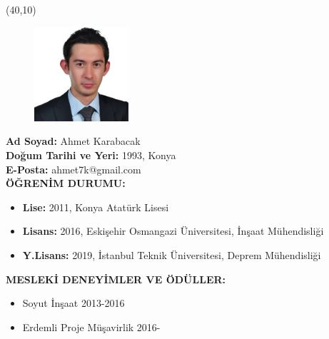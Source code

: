 \vspace{10mm}

\noindent \newsavebox{\mysquare}
\savebox{\mysquare}{\textcolor{black}{\rule[2.3pt]{3.4pt}{3.4pt}}}

\setlength{\TPHorizModule}{10pt}
\setlength{\TPVertModule}{10pt}

\begin{textblock}{1}(40,10)
 	\begin{figure}[p]
		\includegraphics[width=3.5cm,keepaspectratio=true]{./fig/CV.jpg}
	\end{figure}
\end{textblock}

\noindent \textbf{Ad Soyad:} Ahmet Karabacak \\

\vspace{-3mm}
 \textbf{Doğum Tarihi ve Yeri:} 1993, Konya \\

\vspace{-3mm}
 \textbf{E-Posta:} ahmet7k@gmail.com \\

\textbf{ÖĞRENİM DURUMU:} \vspace{-3mm}
\begin{itemize}
	\item \textbf{Lise:} 2011, Konya Atatürk Lisesi 
	\item \textbf{Lisans:} 2016, Eskişehir Osmangazi Üniversitesi, İnşaat Mühendisliği
	\item \textbf{Y.Lisans:} 2019, İstanbul Teknik Üniversitesi, Deprem Mühendisliği 

\end{itemize}

\textbf{MESLEKİ DENEYİMLER VE ÖDÜLLER:} \vspace{-3mm}
\begin{itemize}
	\item Soyut İnşaat 2013-2016 
	\item Erdemli Proje Müşavirlik 2016- 

\end{itemize}

